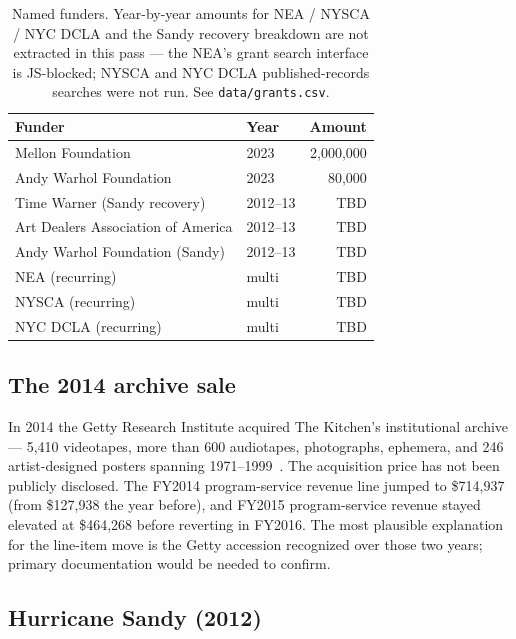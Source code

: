 \documentclass[10pt,letterpaper,twocolumn]{article}
\begin{document}
\begin{table}[h]
\footnotesize
\centering
\begin{tabularx}{\columnwidth}{>{\raggedright\arraybackslash\hspace{0pt}}Xlr}
\toprule
\textbf{Funder} & \textbf{Year} & \textbf{Amount} \\
\midrule
Mellon Foundation & 2023 & 2,000,000 \\
Andy Warhol Foundation & 2023 & 80,000 \\
Time Warner (Sandy recovery) & 2012--13 & TBD \\
Art Dealers Association of America & 2012--13 & TBD \\
Andy Warhol Foundation (Sandy) & 2012--13 & TBD \\
NEA (recurring) & multi & TBD \\
NYSCA (recurring) & multi & TBD \\
NYC DCLA (recurring) & multi & TBD \\
\bottomrule
\end{tabularx}
\caption{Named funders. Year-by-year amounts for NEA / NYSCA / NYC DCLA and the Sandy recovery breakdown are not extracted in this pass --- the NEA's grant search interface is JS-blocked; NYSCA and NYC DCLA published-records searches were not run. See \texttt{data/grants.csv}.}
\label{tab:grants}
\end{table}

\subsection{The 2014 archive sale}

In 2014 the Getty Research Institute acquired The Kitchen's institutional archive --- 5{,}410 videotapes, more than 600 audiotapes, photographs, ephemera, and 246 artist-designed posters spanning 1971--1999~\citep{getty_kitchen_archive}. The acquisition price has not been publicly disclosed. The FY2014 program-service revenue line jumped to \$714{,}937 (from \$127{,}938 the year before), and FY2015 program-service revenue stayed elevated at \$464{,}268 before reverting in FY2016. The most plausible explanation for the line-item move is the Getty accession recognized over those two years; primary documentation would be needed to confirm.

\subsection{Hurricane Sandy (2012)}
\end{document}

